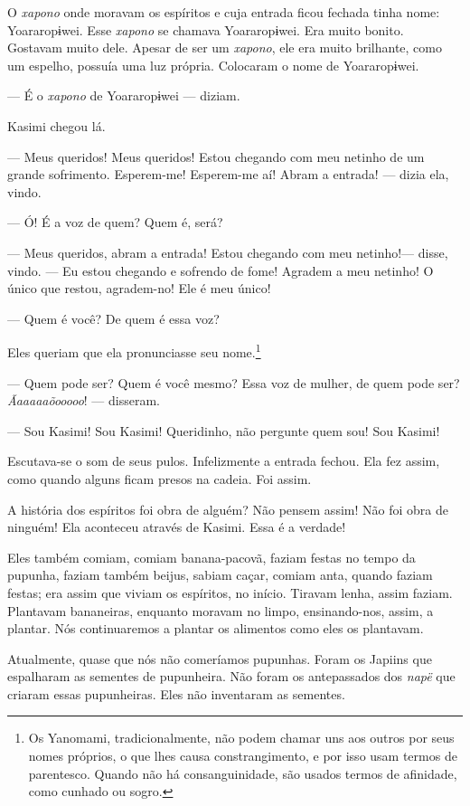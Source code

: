 O \textit{xapono} onde moravam os espíritos e cuja entrada ficou fechada tinha
nome: Yoararopɨwei. Esse \textit{xapono} se chamava Yoararopɨwei. Era muito
bonito. Gostavam muito dele. Apesar de ser um \textit{xapono}, ele era muito
brilhante, como um espelho, possuía uma luz própria. Colocaram o nome de
Yoararopɨwei.

--- É o \textit{xapono} de Yoararopɨwei --- diziam. 

Kasimi chegou lá. 

--- Meus queridos! Meus queridos! Estou chegando com meu netinho de um
grande sofrimento. Esperem-me! Esperem-me aí! Abram a entrada! --- dizia ela,
vindo.

--- Ó! É a voz de quem? Quem é, será?

--- Meus queridos, abram a entrada! Estou chegando com meu netinho!---
disse, vindo. --- Eu estou chegando e sofrendo de fome! Agradem a meu
netinho! O único que restou, agradem-no! Ele é meu único!

--- Quem é você? De quem é essa voz? 

Eles queriam que ela pronunciasse seu nome.\footnote{Os Yanomami, tradicionalmente, não podem chamar uns aos outros por seus nomes próprios, o que lhes causa constrangimento, e por isso usam termos de parentesco. Quando não há consanguinidade, são usados termos de afinidade, como cunhado ou sogro.} 

--- Quem pode ser? Quem é você mesmo? Essa voz de mulher, de quem pode
ser? \textit{Ãaaaaaõooooo}! --- disseram. 

--- Sou Kasimi! Sou Kasimi! Queridinho, não pergunte quem
sou! Sou Kasimi!

Escutava-se o som de seus pulos. Infelizmente a entrada fechou. Ela fez
assim, como quando alguns ficam presos na
cadeia. Foi assim. 

A história dos espíritos foi obra de alguém? Não pensem assim! Não foi
obra de ninguém! Ela aconteceu através de Kasimi. Essa é a verdade! 

Eles também comiam, comiam banana-pacovã, faziam festas no tempo da
pupunha, faziam também beijus, sabiam caçar, comiam anta, quando faziam
festas; era assim que viviam os espíritos, no início. Tiravam lenha,
assim faziam. Plantavam bananeiras, enquanto moravam no limpo,
ensinando-nos, assim, a plantar. Nós continuaremos a plantar os
alimentos como eles os plantavam. 

Atualmente, quase que nós não comeríamos pupunhas. Foram os Japiins que
espalharam as sementes de pupunheira. Não foram os antepassados
dos \textit{napë} que criaram essas pupunheiras. Eles não inventaram as
sementes. 

